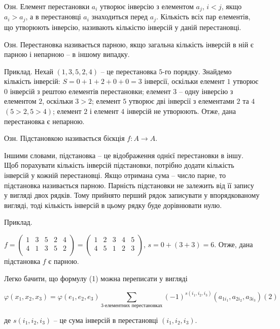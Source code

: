 Озн. Елемент перестановки $a_i$ утворює інверсію з елементом $a_j$, $i<j$, якщо
$a_i > a_j$, а в перестановці $a_i$ знаходиться перед $a_j$. Кількість всіх пар елементів, що
утворюють інверсію, називають кількістю інверсій у даній перестановці.



Озн. Перестановка називається парною, якщо загальна кількість інверсій в ній
є парною і непарною -- в іншому випадку.



Приклад. Нехай $(1,3,5,2,4)$ -- це перестановка $5$-го порядку. Знайдемо
кількість інверсій: $S = 0 + 1 + 2 + 0 + 0 = 3$ інверсії, оскільки елемент $1$ утворює $0$
інверсій з рештою елементів перестановки; елемент $3$ -- одну інверсію з елементом
$2$, оскільки $3 > 2$; елемент $5$ утворює дві інверсії з елементами $2$ та $4$ $(5>2,5>4)$;
елемент $2$ і елемент $4$ інверсій не утворюють. Отже, дана перестановка є
непарною.



Озн. Підстановкою називається бієкція $f: A \rightarrow A$.

Іншими словами, підстановка -- це відображення однієї перестановки в іншу.
Щоб порахувати кількість інверсій підстановки, потрібно додати кількість інверсій
у кожній перестановці. Якщо отримана сума -- число парне, то підстановка
називається парною. Парність підстановки не залежить від її запису у вигляді двох
рядків. Тому прийнято перший рядок записувати у впорядкованому вигляді, тоді
кількість інверсій в цьому рядку буде дорівнювати нулю.


Приклад.

$f = \begin{pmatrix}
	1 & 3 & 5 & 2 & 4 \\
	4 & 1 & 3 & 5 & 2 \\
\end{pmatrix} = \begin{pmatrix}
	1 & 2 & 3 & 4 & 5 \\
	4 & 5 & 1 & 2 & 3 \\
\end{pmatrix}$, $s = 0 + (3 + 3) = 6$. Отже,
дана підстановка $f$ є парною.

Легко бачити, що формулу (1) можна переписати у вигляді

$$\varphi(x_1, x_2, x_3) = \varphi(e_1, e_2, e_3)\sum\limits_{\text{3-елементних перестановках}} (-1)^{s(i_1, i_2, i_3)} (a_{1 i_1}, a_{2 i_2}, a_{3 i_3}) (2)$$


де $s(i_1, i_2, i_3)$ -- це сума інверсій в перестановці $(i_1, i_2, i_3)$. 



